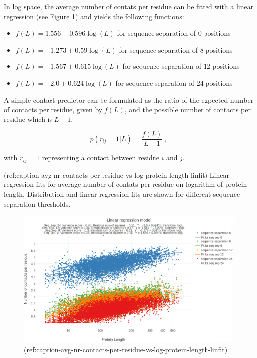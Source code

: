 \documentclass[12pt,a4paper,twoside]{book}
\providecommand{\tightlist}{%
  \setlength{\itemsep}{0pt}\setlength{\parskip}{0pt}}
\theoremstyle{definition}
\theoremstyle{definition}
\theoremstyle{remark}
\begin{document}
In log space, the average number of contats per residue can be fitted
with a linear regression (see Figure
\ref{fig:avg-nr-contacts-per-residue-vs-log-protein-length-linfit}) and
yields the following functions:

\begin{itemize}
\tightlist
\item
  \(f(L) = 1.556 + 0.596 \log (L)\) for sequence separation of 0
  positions
\item
  \(f(L) = -1.273 + 0.59 \log (L)\) for sequence separation of 8
  positions
\item
  \(f(L) = -1.567 + 0.615 \log (L)\) for sequence separation of 12
  positions
\item
  \(f(L) = -2.0 + 0.624 \log (L)\) for sequence separation of 24
  positions
\end{itemize}

A simple contact predictor can be formulated as the ratio of the
expected number of contacts per residue, given by \(f(L)\), and the
possible number of contacts per residue which is \(L-1\),

\[
p(r_{ij} = 1 | L) = \frac{f(L)}{L-1} \; ,
\]

with \(r_{ij}=1\) representing a contact between residue \(i\) and
\(j\).

(ref:caption-avg-nr-contacts-per-residue-vs-log-protein-length-linfit)
Linear regression fits for average number of contats per residue on
logarithm of protein length. Distribution and linear regression fits are
shown for different sequence separation thresholds.

\begin{figure}

{\centering \includegraphics[width=0.9\linewidth]{img/random_forest_contact_prior/model_linreg_transformlogL_no_contacts_per_residue_vs_protein_length_thr8} 

}

\caption{(ref:caption-avg-nr-contacts-per-residue-vs-log-protein-length-linfit)}\label{fig:avg-nr-contacts-per-residue-vs-log-protein-length-linfit}
\end{figure}
\end{document}
